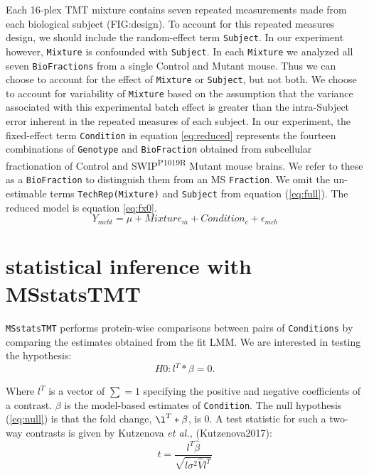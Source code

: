 \documentclass[11pt]{elife}\usepackage[]{graphicx}\usepackage[]{color}
\begin{document}
Each 16-plex TMT mixture contains seven repeated measurements made from each
biological subject (FIG:design).  To account for this repeated measures
design, we should include the random-effect term \texttt{Subject}.
In our experiment however, \texttt{Mixture} is confounded with \texttt{Subject}.
In each \texttt{Mixture} we analyzed all seven \texttt{BioFractions} from a
single Control and Mutant mouse. Thus we can choose to
account for the effect of \texttt{Mixture} or \texttt{Subject}, but not both. We
choose to account for variability of \texttt{Mixture} based on the assumption
that the variance associated with this experimental batch effect is greater than
the intra-Subject error inherent in the repeated measures of each subject.
In our experiment, the fixed-effect term \texttt{Condition} in equation
\ref{eq:reduced} represents the fourteen combinations of \texttt{Genotype} and
\texttt{BioFraction} obtained from subcellular fractionation of Control and
SWIP\textsuperscript{P1019R} Mutant mouse brains. We refer to these as a
\texttt{BioFraction} to distinguish them from an MS \texttt{Fraction}. 
We omit the un-estimable terms \texttt{TechRep(Mixture)} and \texttt{Subject}
from equation (\ref{eq:full}). The reduced model is equation \ref{eq:fx0}.
\begin{equation}
	\label{eq:fx0}
	Y_{mcbt} = \mu + Mixture_m + Condition_c + \epsilon_{mcb}
\end{equation}


\section{statistical inference with MSstatsTMT}

\texttt{MSstatsTMT} performs protein-wise comparisons between pairs of 
\texttt{Conditions} by comparing the estimates obtained from the fit LMM. 
We are interested in testing the hypothesis:
\begin{equation}
	\label{eq:null} %
	H0 : l^T * \beta = 0. 
\end{equation}

Where $l^T$ is a vector of $\sum=1$ specifying the positive and negative
coefficients of a contrast. $\beta$ is the model-based estimates of
\texttt{Condition}.  The null hypothesis (\ref{eq:null}) is that the fold
change, $\l^T * \beta$, is 0.  A test statistic for such a two-way contrasts is
given by Kutzenova \textit{et al.,} (Kutzenova2017):
\begin{equation} 
	\label{eq:tstatistic} %
	t = \frac{l^T \hat{\beta}}{\sqrt{l \sigma^2 \hat{V} l^T}}
\end{equation}
\end{document}
